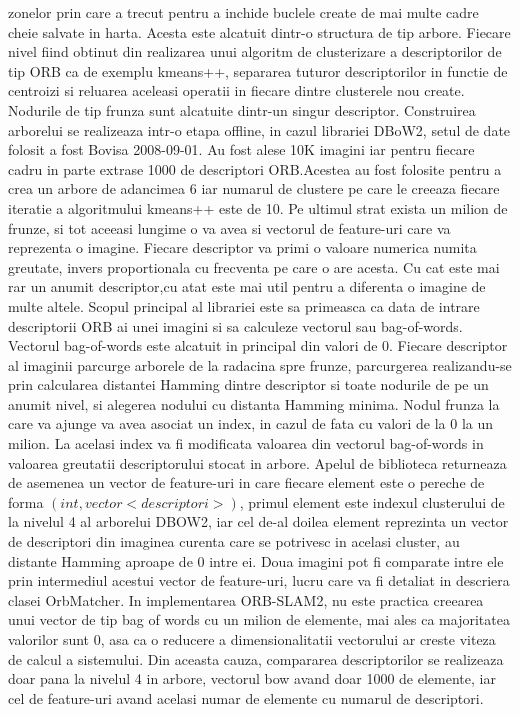 \documentclass[12pt,a4paper]{report}
\begin{document}
zonelor prin care a trecut pentru a inchide buclele create de mai multe cadre cheie salvate
in harta. Acesta este alcatuit dintr-o structura de tip arbore. Fiecare nivel fiind obtinut
din realizarea unui algoritm de clusterizare a descriptorilor de tip ORB ca de exemplu 
kmeans++, separarea tuturor descriptorilor in functie de centroizi si reluarea aceleasi
operatii in fiecare dintre clusterele nou create. Nodurile de tip frunza sunt alcatuite 
dintr-un singur descriptor. Construirea arborelui se realizeaza intr-o etapa offline, in cazul
librariei DBoW2, setul de date folosit a fost Bovisa 2008{-}09{-}01. Au fost alese 10K imagini
iar pentru fiecare cadru in parte extrase 1000 de descriptori ORB.\@ Acestea au fost folosite 
pentru a crea un arbore de adancimea 6 iar numarul de clustere pe care le creeaza fiecare 
iteratie a algoritmului kmeans++ este de 10. Pe ultimul strat exista un milion de frunze, si 
tot aceeasi lungime o va avea si vectorul de feature-uri care va reprezenta o imagine. Fiecare
descriptor va primi o valoare numerica numita greutate, invers proportionala cu frecventa pe 
care o are acesta. Cu cat este mai rar un anumit descriptor,cu atat este mai util pentru a 
diferenta o imagine de multe altele. Scopul principal al librariei este sa primeasca ca data
de intrare descriptorii ORB ai unei imagini si sa calculeze vectorul sau bag-of-words.
Vectorul bag-of-words este alcatuit in principal din valori de 0. Fiecare descriptor al 
imaginii parcurge arborele de la radacina spre frunze, parcurgerea realizandu-se prin 
calcularea distantei Hamming dintre descriptor si toate nodurile de pe un anumit nivel, 
si alegerea nodului cu distanta Hamming minima. Nodul frunza la care va ajunge va avea asociat
un index, in cazul de fata cu valori de la 0 la un milion. La acelasi index va fi modificata
valoarea din vectorul bag-of-words in valoarea greutatii descriptorului stocat in arbore.
Apelul de biblioteca returneaza de asemenea un vector de feature-uri in care fiecare element
este o pereche de forma $ (int, vector<descriptori>) $, primul element este indexul 
clusterului de la nivelul 4 al arborelui DBOW2, iar cel de-al doilea element reprezinta un 
vector de descriptori din imaginea curenta care se potrivesc in acelasi cluster, au distante 
Hamming aproape de 0 intre ei. Doua imagini pot fi comparate intre ele prin intermediul acestui 
vector de feature-uri, lucru care va fi detaliat in descriera clasei OrbMatcher.  
In implementarea ORB-SLAM2, nu este practica creearea unui vector de tip bag of words 
cu un milion de elemente, mai ales ca majoritatea valorilor sunt 0, asa ca o reducere 
a dimensionalitatii vectorului ar creste viteza de calcul a sistemului. Din aceasta cauza,
compararea descriptorilor se realizeaza doar pana la nivelul 4 in arbore, vectorul bow avand 
doar 1000 de elemente, iar cel de feature-uri avand acelasi numar de elemente cu numarul de 
descriptori. 
\end{document}
